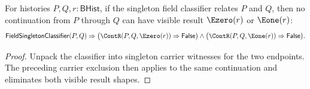\begin{theorem}
\label{thm:field-singleton-classifier-continuation-visible-result-absurd}
For histories $P,Q,r:\mathsf{BHist}$, if the singleton field classifier relates
$P$ and $Q$, then no continuation from $P$ through $Q$ can have visible result
$\Ezero(r)$ or $\Eone(r)$:
$$
\mathsf{FieldSingletonClassifier}(P,Q)\Rightarrow
\bigl(\ContR(P,Q,\Ezero(r))\Rightarrow\mathsf{False}\bigr)\land
\bigl(\ContR(P,Q,\Eone(r))\Rightarrow\mathsf{False}\bigr).
$$
\end{theorem}
\begin{proof}
Unpack the classifier into singleton carrier witnesses for the two endpoints.
The preceding carrier exclusion then applies to the same continuation and
eliminates both visible result shapes.
\end{proof}
